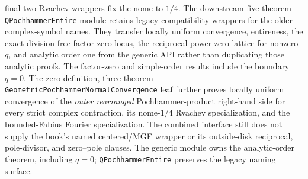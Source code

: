 \documentclass[11pt,a4paper,oneside,openany]{book}
\theoremstyle{definition}
\theoremstyle{remark}
\begin{document}
final two Rvachev wrappers fix the nome to \(1/4\).  The downstream
five-theorem \texttt{QPochhammerEntire} module retains legacy compatibility
wrappers for the older complex-symbol names.  They transfer locally uniform
convergence, entireness, the exact division-free factor-zero locus, the
reciprocal-power zero lattice for nonzero \(q\), and analytic order one from
the generic API rather than duplicating those analytic proofs.  The
factor-zero and simple-order results include the boundary \(q=0\).  The
zero-definition, three-theorem
\texttt{GeometricPochhammerNormalConvergence} leaf further proves locally
uniform convergence of the \emph{outer rearranged} Pochhammer-product
right-hand side for every strict complex contraction, its nome-\(1/4\)
Rvachev specialization, and the bounded-Fabius Fourier specialization.  The
combined interface still does not supply the book's named centered/MGF
wrapper or its outside-disk reciprocal, pole-divisor, and zero--pole clauses.
The generic module owns the analytic-order theorem, including \(q=0\);
\texttt{QPochhammerEntire} preserves the legacy naming surface.
\end{document}
